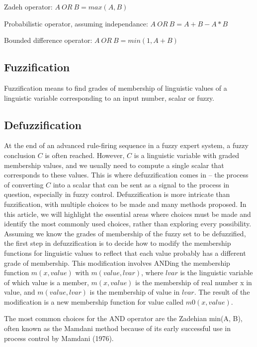 Zadeh operator: \(A \  OR \  B = max(A, B)\)

Probabilistic operator, assuming independance: \( A \  OR \  B = A + B - A \ast B\)

Bounded difference operator: \(A \  OR \  B = min(1, A+B)\)


\subsection{Fuzzification}

Fuzzification means to find grades of membership of linguistic values of a linguistic
variable corresponding to an input number, scalar or fuzzy.



\subsection{Defuzzification}

At the end of an advanced rule-firing sequence in a fuzzy expert system, a fuzzy conclusion \(C\) is often reached. However, \(C\) is a linguistic variable with graded membership values, and we usually need to compute a single scalar that corresponds to these values. This is where defuzzification comes in – the process of converting \(C\) into a scalar that can be sent as a signal to the process in question, especially in fuzzy control.
Defuzzification is more intricate than fuzzification, with multiple choices to be made and many methods proposed. In this article, we will highlight the essential areas where choices must be made and identify the most commonly used choices, rather than exploring every possibility.
Assuming we know the grades of membership of the fuzzy set to be defuzzified, the first step in defuzzification is to decide how to modify the membership functions for linguistic values to reflect that each value probably has a different grade of membership. This modification involves ANDing the membership function \(m(x,value)\) with \(m(value,lvar)\), where \(lvar\) is the linguistic variable of which value is a member, \(m(x,value)\) is the membership of real number x in value, and \(m(value,lvar)\) is the membership of value in \(lvar\). The result of the modification is a new membership function for value called \(m0(x,value)\).

The most common choices for the AND operator are the Zadehian
min(A, B), often known as the Mamdani method because of its early successful
use in process control by Mamdani (1976). 

